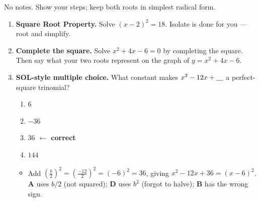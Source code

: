 \documentclass[10pt]{article}
\begin{document}

\vspace{0.12in}

No notes. Show your steps; keep both roots in simplest radical form.

\begin{enumerate}[leftmargin=1.8em, itemsep=12pt]
  \item \textbf{Square Root Property.} Solve $(x-2)^2=18$. Isolate is done for you --- root and simplify.
  \item \textbf{Complete the square.} Solve $x^2+4x-6=0$ by completing the square. Then say what your two
        roots represent on the graph of $y=x^2+4x-6$.
  \item \textbf{SOL-style multiple choice.} What constant makes $x^2-12x+\underline{\hphantom{00}}$ a
        perfect-square trinomial?
        \begin{enumerate}[label=\Alph*., leftmargin=1.9em, itemsep=1pt]
          \item $6$
          \item $-36$
          \item $36$ \textcolor{keyred}{\textbf{$\leftarrow$ correct}}
          \item $144$
        \end{enumerate}
        \begin{itemize}[leftmargin=1.4em, nosep]
          \item[] Add $\left(\tfrac{b}{2}\right)^2=\left(\tfrac{-12}{2}\right)^2=(-6)^2=36$, giving $x^2-12x+36=(x-6)^2$. \textbf{A} uses $b/2$ (not squared); \textbf{D} uses $b^2$ (forgot to halve); \textbf{B} has the wrong sign.
        \end{itemize}
\end{enumerate}
\end{document}
